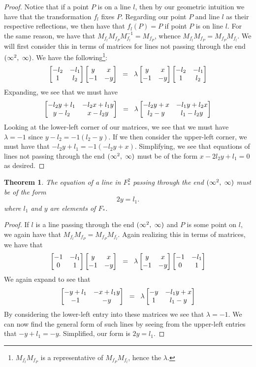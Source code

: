 \documentclass[12pt]{article}
\newcommand{\lftmat}[4]{\begin{bmatrix} {#1} & {#2} \\ {#3} & {#4} \end{bmatrix}}
\newcommand{\pointmat}[2]{\lftmat{{#2}}{{#1}}{-1}{-{#2}}}
\newcommand{\stanpointmat}{\pointmat{x}{y}}
\newcommand{\linenoendmat}[2]{\begin{bmatrix} -{#2} & -{#1} \\ 1 & {#2} \end{bmatrix}}
\newcommand{\stanlinenoendmat}{\linenoendmat{l_1}{l_2}}
\newcommand{\lineendmat}[2]{\begin{bmatrix} -1 & -{#1} \\ 0 & 1 \end{bmatrix}}
\newcommand{\stanlineendmat}{\lineendmat{l_1}{l_2}}
\newcommand{\spceq}{\hspace{2mm} = \hspace{2mm}}
\newcommand{\ttc}{, \hspace{1mm}}
\newcommand{\inv}{^{-1}}
\newcommand{\specialend}{(\infty^2\ttc\infty)}
\theoremstyle{plain}
\newtheorem{theorem}{Theorem}[section]
\theoremstyle{definition}
\begin{document}
\begin{proof}
Notice that if a point $P$ is on a line $l$, then by our geometric intuition we have that the transformation $f_l$ fixes $P$. Regarding our point $P$ and line $l$ as their respective reflections, we then have that $f_l(P) = P$ if point $P$ is on line $l$. For the same reason, we have that $M_{f_l} M_{f_P} M_{f_l}\inv = M_{f_P}$, whence $M_{f_l} M_{f_P} = M_{f_P} M_{f_l}$. We will first consider this in terms of matrices for lines not passing through the end $\specialend$. We have the following\footnote{$M_{f_l} M_{f_P}$ is a representative of $M_{f_P} M_{f_l}$, hence the $\lambda$.}:
\begin{equation} 
\stanlinenoendmat\stanpointmat \spceq \lambda \stanpointmat\stanlinenoendmat
\end{equation}	
Expanding, we see that we must have
	\[
		\lftmat{-l_2y+l_1}{-l_2x+l_1y}{y-l_2}{x-l_2y} \spceq \lambda \lftmat{-l_2y+x}{-l_1y+l_2x}{l_2-y}{l_1-l_2y}
	\]
Looking at the lower-left corner of our matrices, we see that we must have $\lambda = -1$ since $y - l_2 = -1(l_2 - y)$. If we then consider the upper-left corner, we must have that $-l_2y + l_1 = -1(-l_2y + x)$. Simplifying, we see that equations of lines not passing through the end $\specialend$ must be of the form $x - 2l_2y + l_1  = 0$ as desired.
\end{proof}

\begin{theorem} The equation of a line in $F_*^2$ passing through the end $\specialend$ must be of the form 
\begin{equation}
	2y = l_1.
\end{equation} 
where $l_1$ and $y$ are elements of $F_*$.
\end{theorem}

\begin{proof} If $l$ is a line passing through the end $\specialend$ and $P$ is some point on $l$, we again have that $M_{f_l} M_{f_P} = M_{f_P} M_{f_l}$. Again realizing this in terms of matrices, we have that 
\begin{equation} 
	\stanlineendmat\stanpointmat \spceq \lambda \stanpointmat\stanlineendmat
\end{equation}	
We again expand to see that 
	\[
		\lftmat{-y+l_1}{-x+l_1y}{-1}{-y} \spceq \lambda \lftmat{-y}{-l_1y+x}{1}{l_1-y}
	\]
By considering the lower-left entry into these matrices we see that $\lambda = -1$. We can now find the general form of such lines by seeing from the upper-left entries that $-y+l_1 = -y$. Simplified, our form is $2y = l_1$. 
\end{proof}
\end{document}
